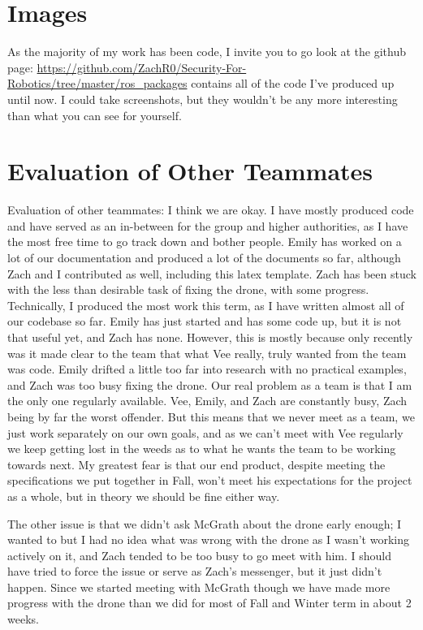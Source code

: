 \documentclass[IEEEtran,letterpaper,10pt,notitlepage,draftclsnofoot,onecolumn]{article}
\begin{document}
\section{Images}
As the majority of my work has been code, I invite you to go look at the github page: \url{https://github.com/ZachR0/Security-For-Robotics/tree/master/ros_packages} contains all of the code I've produced up until now. 
I could take screenshots, but they wouldn't be any more interesting than what you can see for yourself.

\section{Evaluation of Other Teammates}
Evaluation of other teammates:
I think we are okay. I have mostly produced code and have served as an in-between for the group and higher authorities, as I have the most free time to go track down and bother people. Emily has worked on a lot of our 
documentation and produced a lot of the documents so far, although Zach and I contributed as well, including this latex template. Zach has been stuck with the less than desirable task of fixing the drone, with some progress.
Technically, I produced the most work this term, as I have written almost all of our codebase so far. Emily has just started and has some code up, but it is not that useful yet, and Zach has none. However, 
this is mostly because only recently was it made clear to the team that what Vee really, truly wanted from the team was code. Emily drifted a little too far into research with no practical examples, and 
Zach was too busy fixing the drone. Our real problem as a team is that I am the only one regularly available. Vee, Emily, and Zach are constantly busy, Zach being by far the worst offender. But this 
means that we never meet as a team, we just work separately on our own goals, and as we can't meet with Vee regularly we keep getting lost in the weeds as to what he wants the team to be working towards
next. My greatest fear is that our end product, despite meeting the specifications we put together in Fall, won't meet his expectations for the project as a whole, but in theory we should be fine either way. 

The other issue is that we didn't ask McGrath about the drone early enough; I wanted to but I had no idea what was wrong with the drone as I wasn't working actively on it, and Zach tended to be too busy to go meet with him.
I should have tried to force the issue or serve as Zach's messenger, but it just didn't happen. Since we started meeting with McGrath though we have made more progress with the drone than we did for most of Fall and Winter
term in about 2 weeks.



\end{document}
